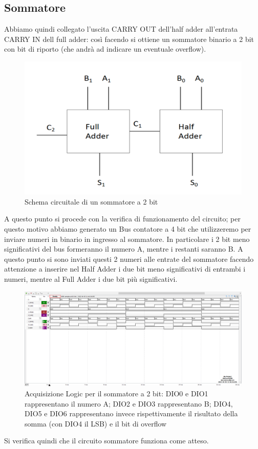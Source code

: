 \documentclass[10pt, a4paper, italian]{article}
\begin{document}
\subsection{Sommatore}
Abbiamo quindi collegato l'uscita CARRY OUT  dell'half adder all'entrata CARRY IN dell full adder: così facendo si ottiene un sommatore binario a 2 bit con bit di riporto (che andrà ad indicare un eventuale overflow).
\begin{figure}[htbp]
    \centering
    \includegraphics[width=0.6\linewidth]{sum.png}
    \caption{\label{fig: sommatore}Schema circuitale di un sommatore a 2 bit}
    
\end{figure}

A questo punto si procede con la verifica di funzionamento del circuito; per questo motivo abbiamo generato un Bus contatore a 4 bit che utilizzeremo per inviare numeri in binario in ingresso al sommatore.
In particolare i 2 bit meno significativi del bus formeranno il numero A, mentre i restanti saranno B.
A questo punto si sono inviati questi 2 numeri alle entrate del sommatore facendo attenzione a inserire nel Half Adder i due bit meno significativi di entrambi i numeri, mentre al Full Adder i due bit più significativi.

\begin{figure}[htbp]
    \centering
    \includegraphics[width=\linewidth]{sum_time.png}
    \caption{\label{fig: faAD2}Acquisizione Logic per il sommatore a 2 bit: DIO0 e DIO1 rappresentano il numero A; DIO2 e DIO3 rappresentano B; DIO4, DIO5 e DIO6 rappresentano invece rispettivamente il risultato della somma (con DIO4 il LSB) e il bit di overflow}
    
\end{figure}
Si verifica quindi che il circuito sommatore funziona come atteso.
\end{document}
